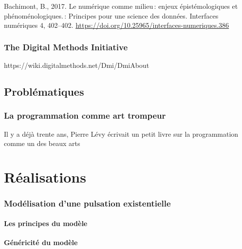 \documentclass[
  letterpaper,
  DIV=11,
  numbers=noendperiod]{scrreprt}
\begin{document}
Bachimont, B., 2017. Le numérique comme milieu\,: enjeux
épistémologiques et phénoménologiques.\,: Principes pour une science des
données. Interfaces numériques 4, 402--402.
\url{https://doi.org/10.25965/interfaces-numeriques.386}

\hypertarget{the-digital-methods-initiative}{%
\subsection{The Digital Methods
Initiative}\label{the-digital-methods-initiative}}

https://wiki.digitalmethods.net/Dmi/DmiAbout

\hypertarget{probluxe9matiques}{%
\section{Problématiques}\label{probluxe9matiques}}

\hypertarget{la-programmation-comme-art-trompeur}{%
\subsection{La programmation comme art
trompeur}\label{la-programmation-comme-art-trompeur}}

Il y a déjà trente ans, Pierre Lévy écrivait un petit livre sur la
programmation comme un des beaux arts

\hypertarget{sec-realisations}{%
\chapter{Réalisations}\label{sec-realisations}}

\hypertarget{moduxe9lisation-dune-pulsation-existentielle}{%
\subsection{Modélisation d'une pulsation
existentielle}\label{moduxe9lisation-dune-pulsation-existentielle}}

\hypertarget{les-principes-du-moduxe8le}{%
\subsubsection{Les principes du
modèle}\label{les-principes-du-moduxe8le}}

\hypertarget{guxe9nuxe9ricituxe9-du-moduxe8le}{%
\subsubsection{Généricité du
modèle}\label{guxe9nuxe9ricituxe9-du-moduxe8le}}
\end{document}
